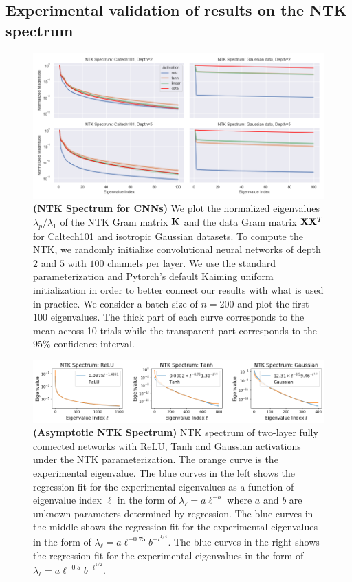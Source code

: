 \subsection{Experimental validation of results on the NTK spectrum}\label{appendix:subsection:emp_validation_ef}
\begin{figure}[ht]
    \centering
    \includegraphics[width=\textwidth]{conference_files/images/cnn_spectrums2.png}
    \caption{\textbf{(NTK Spectrum for CNNs)} We plot the normalized eigenvalues $\lambda_p / \lambda_1$ of the NTK Gram matrix $\mathbf{K}$ and the data Gram matrix $\mathbf{X} \mathbf{X}^T$ for Caltech101 and isotropic Gaussian datasets. To compute the NTK, we randomly initialize convolutional neural networks of depth $2$ and $5$ with $100$ channels per layer. We use the standard parameterization and Pytorch's default Kaiming uniform initialization in order to better connect our results with what is used in practice. We consider a batch size of $n = 200$ and plot the first $100$ eigenvalues. The thick part of each curve corresponds to the mean across 10 trials while the transparent part corresponds to the 95\% confidence interval.}
    \label{fig:spectrum_cnn}
\end{figure}
\begin{figure}[ht]
    \centering    \includegraphics[width=\textwidth]{conference_files/images/asym_spectrum.png}
    \caption{\textbf{ (Asymptotic NTK Spectrum) }NTK spectrum of two-layer fully connected networks with ReLU, Tanh and Gaussian activations under the NTK parameterization. The orange curve is the experimental eigenvalue. The blue curves in the left shows the regression fit for the experimental eigenvalues as a function of eigenvalue index $\ell$ in the form of $\lambda_\ell=a\ell^{-b}$ where $a$ and $b$ are unknown parameters determined by regression. The blue curves in the middle shows the regression fit for the experimental eigenvalues in the form of $\lambda_\ell=a\ell^{-0.75}b^{-l^{1/4}}$. The blue curves in the right shows the regression fit for the experimental eigenvalues in the form of $\lambda_\ell=a\ell^{-0.5}b^{-l^{1/2}}$.}
    \label{fig:asym_spectrum}
\end{figure}
